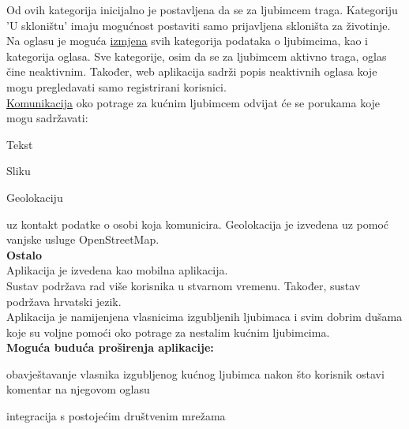 		Od ovih kategorija inicijalno je postavljena da se za ljubimcem traga. Kategoriju 'U skloništu' imaju mogućnost postaviti samo prijavljena skloništa za životinje. Na oglasu je moguća
		 \underline{izmjena} svih kategorija podataka o ljubimcima, kao i kategorija oglasa. Sve kategorije, osim da se za ljubimcem aktivno traga, oglas čine neaktivnim. Također, web aplikacija sadrži popis neaktivnih oglasa koje mogu pregledavati samo registrirani korisnici.\\
		\underline{Komunikacija} oko potrage za kućnim ljubimcem odvijat će se porukama koje mogu sadržavati:
		\begin{packed_item}
			\item Tekst
			\item Sliku
			\item Geolokaciju
		\end{packed_item}
		uz kontakt podatke o osobi koja komunicira. Geolokacija je izvedena uz pomoć vanjske usluge OpenStreetMap.\\
		
		\textbf{Ostalo}\\
		Aplikacija je izvedena kao mobilna aplikacija.\\
		Sustav podržava rad više korisnika u stvarnom vremenu. Također, sustav podržava hrvatski jezik.\\
		Aplikacija je namijenjena vlasnicima izgubljenih ljubimaca i svim dobrim dušama koje su voljne pomoći oko potrage za nestalim kućnim ljubimcima.\\
		
		\textbf{Moguća buduća proširenja aplikacije:}
		\begin{packed_item}
			\item obavještavanje vlasnika izgubljenog kućnog ljubimca nakon što korisnik ostavi komentar na njegovom oglasu
			\item integracija s postojećim društvenim mrežama
		\end{packed_item}
		
		
